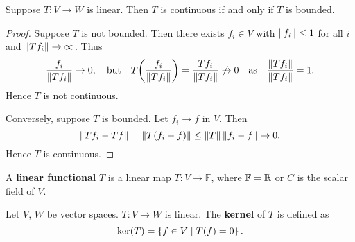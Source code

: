 \begin{proposition}
    Suppose $T:V\to W$ is linear. Then $T$ is continuous if and 
    only if $T$ is bounded.
\end{proposition}
\begin{proof}
    Suppose $T$ is not bounded. Then there exists $f_i\in V$ with 
    $\left\lVert {f_i} \right\rVert \leq 1$ for all $i$ and $\left\lVert {Tf_i} \right\rVert\to\infty$. 
    Thus 
    \begin{equation*}
        \frac{f_i}{\norm{Tf_i}}\to 0, \quad \text{but}\quad 
        T\pth{\frac{f_i}{\norm{Tf_i}}} = \frac{Tf_i}{\norm{Tf_i}} \not\to 0 
        \quad \text{as}\quad \frac{\norm{Tf_i}}{\norm{Tf_i}} = 1. 
    \end{equation*}
    Hence $T$ is not continuous. 

    Conversely, suppose $T$ is bounded. Let $f_i\to f$ in $V$. 
    Then 
    \begin{equation*}
        \left\lVert {Tf_i-Tf} \right\rVert = \left\lVert {T(f_i-f)} \right\rVert \leq \left\lVert {T} \right\rVert\left\lVert {f_i-f} \right\rVert\to 0.
    \end{equation*}
    Hence $T$ is continuous.
\end{proof}

\begin{definition}
    A \textbf{linear functional} $T$ is a linear map $T:V\to\mathbb{F}$, 
    where $\mathbb{F} = \mathbb{R}$ or $C$ is the scalar field of $V$.
\end{definition} 

\begin{definition}
    Let $V$, $W$ be vector spaces. $T:V\to W$ is linear. 
    The \textbf{kernel} of $T$ is defined as 
    \begin{equation*}
        \ker(T) = \left\{ f\in V \;\middle\vert\; T(f)=0 \right\}.
    \end{equation*}
\end{definition}

